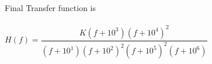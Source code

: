 Final Transfer function is
\\ \\ 
$H(f) = \dfrac{K(f+10^{3})(f+10^{4})^{2}}{(f+10^{1})(f+10^{2})^{2}(f+10^{5})^{2}(f+10^{6})}$
\\ \\
